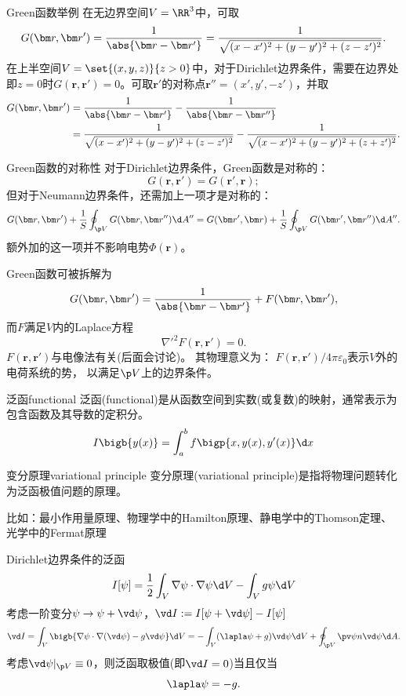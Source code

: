\begin{example}{Green函数举例}{}
    在无边界空间$V=\RR^3$中，可取
    \[
        G(\bm r,\bm r')=\frac1{\abs{\bm r-\bm r'}}=\frac1{\sqrt{(x-x')^2+(y-y')^2+(z-z')^2}}.
    \]
    在上半空间$V=\set{(x,y,z)}{z>0}$中，对于Dirichlet边界条件，需要在边界处即$z=0$时$G(\bm r,\bm r')=0$。可取$\bm r'$的对称点$\bm r''=(x',y',-z')$，并取
    \begin{align*}
        G(\bm r,\bm r')&=\frac1{\abs{\bm r-\bm r'}}-\frac1{\abs{\bm r-\bm r''}}\\
        &=\frac1{\sqrt{(x-x')^2+(y-y')^2+(z-z')^2}}-\frac1{\sqrt{(x-x')^2+(y-y')^2+(z+z')^2}}.
    \end{align*}
\end{example}
\begin{theorem}
    {Green函数的对称性}{}
    对于Dirichlet边界条件，Green函数是对称的：
    \[
        G(\bm r,\bm r')=G(\bm r',\bm r);
    \]
    但对于Neumann边界条件，还需加上一项才是对称的：
    \[
        G(\bm r,\bm r')+\frac1S\oint_{\p V}G(\bm r,\bm r'')\d A''=G(\bm r',\bm r)+\frac1S\oint_{\p V}G(\bm r',\bm r'')\d A''.
    \]
    额外加的这一项并不影响电势$\Phi(\bm r)$。
\end{theorem}
Green函数可被拆解为
\[
    G(\bm r,\bm r')=\frac1{\abs{\bm r-\bm r'}}+F(\bm r,\bm r'),
\]
而$F$满足$V$内的Laplace方程
\[
    \nabla'^2F(\bm r,\bm r')=0.
\]
$F(\bm r, \bm r')$与电像法有关(后面会讨论)。
其物理意义为：
$F(\bm r, \bm r')/4\pi\varepsilon_0$表示$V$外的电荷系统的势，
以满足$\p V$上的边界条件。


\begin{definition}
    {泛函}{functional}
    泛函(functional)是从函数空间到实数(或复数)的映射，通常表示为包含函数及其导数的定积分。
    \begin{equation}
        I\bigb{y(x)}=\int_a^bf\bigp{x,y(x),y'(x)}\d x
    \end{equation}
\end{definition}

\begin{definition}{变分原理}{variational principle}
    变分原理(variational principle)是指将物理问题转化为泛函极值问题的原理。

    比如：最小作用量原理、物理学中的Hamilton原理、静电学中的Thomson定理、光学中的Fermat原理
\end{definition}
Dirichlet边界条件的泛函
\begin{equation}
    I[\psi]=\frac12\int_V\nabla\psi\cdot\nabla\psi\d V-\int_Vg\psi\d V
\end{equation}
考虑一阶变分$\psi\to\psi+\vd\psi$，$\vd I:=I[\psi+\vd\psi]-I[\psi]$
\[
    \vd I=\int_V\bigb{\nabla\psi\cdot\nabla(\vd\psi)-g\vd\psi}\d V=-\int_V(\lapla\psi+g)\vd\psi\d V+\oint_{\p V}\pv\psi n\vd\psi\d A.
\]
考虑$\vd\psi|_{\p V}\equiv 0$，则泛函取极值(即$\vd I=0$)当且仅当
\begin{equation}
    \lapla\psi=-g.
\end{equation}

